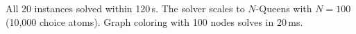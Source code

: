 \begin{table}[t]
\medskip
\small
All 20 instances solved within 120\,s.
The solver scales to $N$-Queens with $N{=}100$ (10,000 choice atoms).
Graph coloring with 100 nodes solves in 20\,ms.
\end{table}

